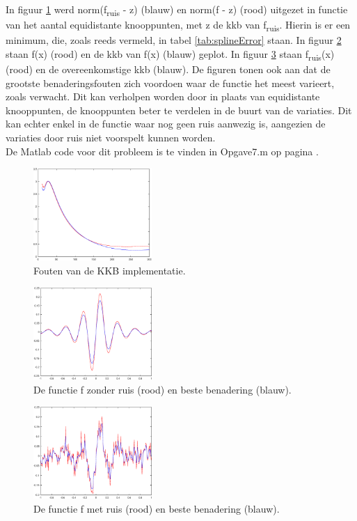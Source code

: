 \documentclass[a4paper]{article}
\begin{document}
In figuur \ref{fig:errorkkb} werd norm(f\textsubscript{ruis} - z) (blauw) en norm(f - z) (rood) uitgezet in functie van het aantal equidistante knooppunten, met z de kkb van f\textsubscript{ruis}. Hierin is er een minimum, die, zoals reeds vermeld, in tabel \ref{tab:splineError} staan. In figuur \ref{fig:plotNoNoise} staan f(x) (rood) en de kkb van f(x) (blauw) geplot. In figuur \ref{fig:plotNoise} staan f\textsubscript{ruis}(x) (rood) en de overeenkomstige kkb (blauw). De figuren tonen ook aan dat de grootste benaderingsfouten zich voordoen waar de functie het meest varieert, zoals verwacht. Dit kan verholpen worden door in plaats van equidistante knooppunten, de knooppunten beter te verdelen in de buurt van de variaties. Dit kan echter enkel in de functie waar nog geen ruis aanwezig is, aangezien de variaties door ruis niet voorspelt kunnen worden. \\

De Matlab code voor dit probleem is te vinden in Opgave7.m op pagina \pageref{sec:code7}.

\begin{figure}[H]
	\begin{center} 
		\includegraphics[width=0.4\textwidth]{ErrorBSplines.eps}
	\end{center}
	\caption{Fouten van de KKB implementatie.}
	\label{fig:errorkkb}
\end{figure}

\begin{figure}[H]
	\begin{center} 
		\includegraphics[width=0.4\textwidth]{PlotSplinesNoNoise.eps}
	\end{center}
	\caption{De functie f zonder ruis (rood) en beste benadering (blauw).}
	\label{fig:plotNoNoise}
\end{figure}

\begin{figure}[H]
	\begin{center} 
		\includegraphics[width=0.4\textwidth]{PlotSplinesNoise.eps}
	\end{center}
	\caption{De functie f met ruis (rood) en beste benadering (blauw).}
	\label{fig:plotNoise}
\end{figure}
\end{document}
